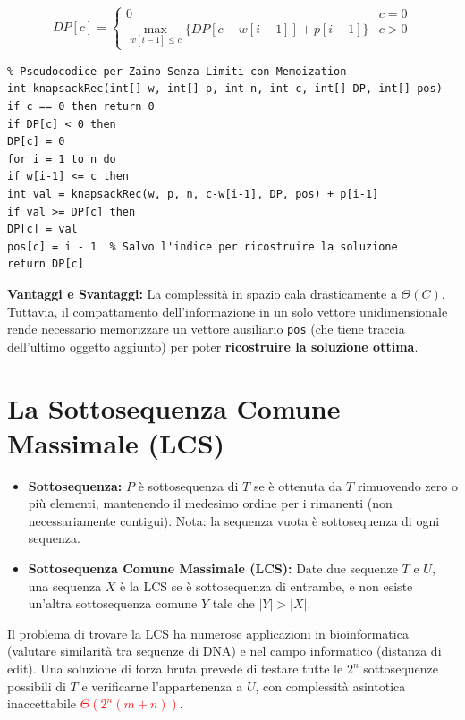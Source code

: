 \documentclass[12pt, a4paper]{article}
\begin{document}
$$DP[c]=\begin{cases}0&c=0\\\max_{w[i-1]\le c}\{DP[c-w[i-1]]+p[i-1]\}&c>0\end{cases}$$

\begin{verbatim}
% Pseudocodice per Zaino Senza Limiti con Memoization
int knapsackRec(int[] w, int[] p, int n, int c, int[] DP, int[] pos)
if c == 0 then return 0
if DP[c] < 0 then
DP[c] = 0
for i = 1 to n do
if w[i-1] <= c then
int val = knapsackRec(w, p, n, c-w[i-1], DP, pos) + p[i-1]
if val >= DP[c] then
DP[c] = val
pos[c] = i - 1  % Salvo l'indice per ricostruire la soluzione
return DP[c]
\end{verbatim}

\textbf{Vantaggi e Svantaggi:}
La complessità in spazio cala drasticamente a $\Theta(C)$. Tuttavia, il compattamento dell'informazione in un solo vettore unidimensionale rende necessario memorizzare un vettore ausiliario \texttt{pos} (che tiene traccia dell'ultimo oggetto aggiunto) per poter \textbf{ricostruire la soluzione ottima}.

\newpage

\section{La Sottosequenza Comune Massimale (LCS)}

\begin{tcolorbox}[colback=lightergray!10, colframe=tocsec, title=\textbf{Definizioni}]
\begin{itemize}
\item \textbf{Sottosequenza:} $P$ è sottosequenza di $T$ se è ottenuta da $T$ rimuovendo zero o più elementi, mantenendo il medesimo ordine per i rimanenti (non necessariamente contigui). Nota: la sequenza vuota è sottosequenza di ogni sequenza.
\item \textbf{Sottosequenza Comune Massimale (LCS):} Date due sequenze $T$ e $U$, una sequenza $X$ è la LCS se è sottosequenza di entrambe, e non esiste un'altra sottosequenza comune $Y$ tale che $\vert{}Y\vert{} > \vert{}X\vert{}$.
\end{itemize}
\end{tcolorbox}

Il problema di trovare la LCS ha numerose applicazioni in bioinformatica (valutare similarità tra sequenze di DNA) e nel campo informatico (distanza di edit).
Una soluzione di forza bruta prevede di testare tutte le $2^n$ sottosequenze possibili di $T$ e verificarne l'appartenenza a $U$, con complessità asintotica inaccettabile \textcolor{red}{$\Theta(2^n(m+n))$}.
\end{document}
